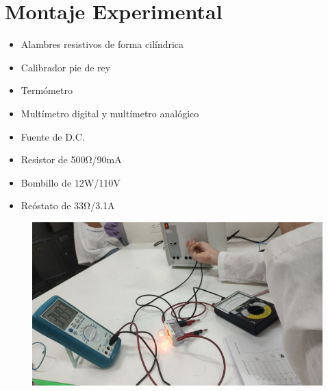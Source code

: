 \documentclass[10pt]{article}
\begin{document}
\section{Montaje Experimental}

\begin{multicols}{2}
	\begin{itemize}
		\item Alambres resistivos de forma cilíndrica
		\item Calibrador pie de rey
		\item Termómetro
		\item Multímetro digital y multímetro analógico
		\item Fuente de D.C.
		\item Resistor de 500Ω/90mA
		\item Bombillo de 12W/110V
		\item Reóstato de 33Ω/3.1A
	\end{itemize}

	\begin{figure}[H]
		\includegraphics[scale = .1]{./Images/ME1.jpeg}
	\end{figure}


\end{multicols}
\end{document}
